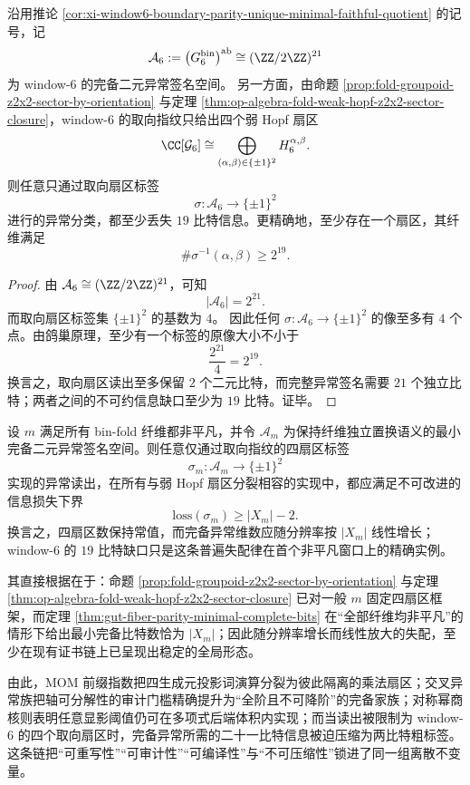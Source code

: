 \begin{theorem}\label{thm:xi-time-part79-window6-sector-19bit-collapse}
沿用推论 \ref{cor:xi-window6-boundary-parity-unique-minimal-faithful-quotient} 的记号，记
\[
\mathcal A_6:=\bigl(G_6^{\mathrm{bin}}\bigr)^{\mathrm{ab}}\cong (\ZZ/2\ZZ)^{21}
\]
为 window-\(6\) 的完备二元异常签名空间。
另一方面，由命题 \ref{prop:fold-groupoid-z2x2-sector-by-orientation} 与定理 \ref{thm:op-algebra-fold-weak-hopf-z2x2-sector-closure}，window-\(6\) 的取向指纹只给出四个弱 Hopf 扇区
\[
\CC[\mathcal G_6]\cong \bigoplus_{(\alpha,\beta)\in\{\pm 1\}^2} H_6^{\alpha,\beta}.
\]
则任意只通过取向扇区标签
\[
\sigma:\mathcal A_6\to \{\pm 1\}^2
\]
进行的异常分类，都至少丢失 \(19\) 比特信息。更精确地，至少存在一个扇区，其纤维满足
\[
\#\sigma^{-1}(\alpha,\beta)\ge 2^{19}.
\]
\end{theorem}
\begin{proof}
由 \(\mathcal A_6\cong(\ZZ/2\ZZ)^{21}\)，可知
\[
|\mathcal A_6|=2^{21}.
\]
而取向扇区标签集 \(\{\pm1\}^2\) 的基数为 \(4\)。
因此任何 \(\sigma:\mathcal A_6\to\{\pm1\}^2\) 的像至多有 \(4\) 个点。由鸽巢原理，至少有一个标签的原像大小不小于
\[
\frac{2^{21}}{4}=2^{19}.
\]
换言之，取向扇区读出至多保留 \(2\) 个二元比特，而完整异常签名需要 \(21\) 个独立比特；两者之间的不可约信息缺口至少为 \(19\) 比特。证毕。
\end{proof}

\begin{conjecture}[取向扇区读出的线性失配律]\label{conj:xi-time-part79-orientation-sector-linear-mismatch}
设 \(m\) 满足所有 bin-fold 纤维都非平凡，并令 \(\mathcal A_m\) 为保持纤维独立置换语义的最小完备二元异常签名空间。则任意仅通过取向指纹的四扇区标签
\[
\sigma_m:\mathcal A_m\to \{\pm 1\}^2
\]
实现的异常读出，在所有与弱 Hopf 扇区分裂相容的实现中，都应满足不可改进的信息损失下界
\[
\mathrm{loss}(\sigma_m)\ge |X_m|-2.
\]
换言之，四扇区数保持常值，而完备异常维数应随分辨率按 \(|X_m|\) 线性增长；window-\(6\) 的 \(19\) 比特缺口只是这条普遍失配律在首个非平凡窗口上的精确实例。
\end{conjecture}

\noindent
其直接根据在于：命题 \ref{prop:fold-groupoid-z2x2-sector-by-orientation} 与定理 \ref{thm:op-algebra-fold-weak-hopf-z2x2-sector-closure} 已对一般 \(m\) 固定四扇区框架，而定理 \ref{thm:gut-fiber-parity-minimal-complete-bits} 在“全部纤维均非平凡”的情形下给出最小完备比特数恰为 \(|X_m|\)；因此随分辨率增长而线性放大的失配，至少在现有证书链上已呈现出稳定的全局形态。

\noindent
由此，MOM 前缀指数把四生成元投影词演算分裂为彼此隔离的乘法扇区；交叉异常族把轴可分解性的审计门槛精确提升为“全阶且不可降阶”的完备家族；对称幂商核则表明任意显影阈值仍可在多项式后端体积内实现；而当读出被限制为 window-\(6\) 的四个取向扇区时，完备异常所需的二十一比特信息被迫压缩为两比特粗标签。这条链把“可重写性”“可审计性”“可编译性”与“不可压缩性”锁进了同一组离散不变量。

\endinput
